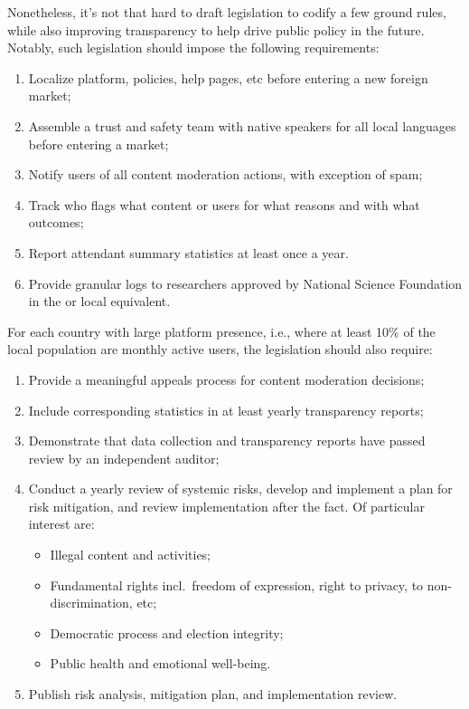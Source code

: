 Nonetheless, it's not that hard to draft legislation to codify a few ground
rules, while also improving transparency to help drive public policy in the
future. Notably, such legislation should impose the following requirements:
\begin{enumerate}
    \item Localize platform, policies, help pages, etc before entering
        a new foreign market; \label{itm:law:localized}
    \item Assemble a trust and safety team with native speakers for all local
        languages before entering a market; \label{itm:law:team}
    \item Notify users of all content moderation actions, with exception of spam;
    \item Track who flags what content or users for what reasons and with what
        outcomes;
    \item Report attendant summary statistics at least once a year.
    \item Provide granular logs to researchers approved by National Science
        Foundation in the  or local equivalent. \label{itm:law:research}
\end{enumerate}
For each country with large platform presence, i.e., where at least 10\% of the
local population are monthly active users, the legislation should also require:
\begin{enumerate}[resume]
    \item Provide a meaningful appeals process for content moderation decisions;
        \label{itm:law:appeals}
    \item Include corresponding statistics in at least yearly transparency
        reports;
    \item Demonstrate that data collection and transparency reports have passed
        review by an independent auditor;
    \item Conduct a yearly review of systemic risks, develop and implement a
        plan for risk mitigation, and review implementation after the fact. Of
        particular interest are:
        \begin{itemize}
            \item Illegal content and activities;
            \item Fundamental rights incl.\ freedom of expression, right to
                privacy, to non-discrimination, etc;
            \item Democratic process and election integrity;
            \item Public health and emotional well-being.
        \end{itemize} \label{itm:risk:review}
    \item Publish risk analysis, mitigation plan, and implementation review.
        \label{itm:law:publicrisk}
\end{enumerate}
